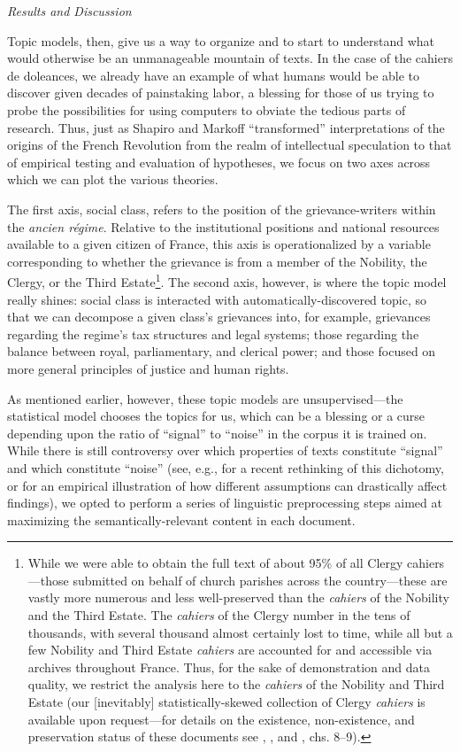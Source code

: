 \textit{Results and Discussion}

Topic models, then, give us a way to organize and to start to understand what would otherwise be an unmanageable mountain of texts. In the case of the cahiers de doleances, we already have an example of what humans would be able to discover given decades of painstaking labor, a blessing for those of us trying to probe the possibilities for using computers to obviate the tedious parts of research. Thus, just as Shapiro and Markoff ``transformed'' interpretations of the origins of the French Revolution from the realm of intellectual speculation to that of empirical testing and evaluation of hypotheses, we focus on two axes across which we can plot the various theories.

The first axis, social class, refers to the position of the grievance-writers within the \textit{ancien régime}. Relative to the institutional positions and national resources available to a given citizen of France, this axis is operationalized by a variable corresponding to whether the grievance is from a member of the Nobility, the Clergy, or the Third Estate\footnote{While we were able to obtain the full text of about 95\% of all Clergy cahiers---those submitted on behalf of church parishes across the country---these are vastly more numerous and less well-preserved than the \textit{cahiers} of the Nobility and the Third Estate. The \textit{cahiers} of the Clergy number in the tens of thousands, with several thousand almost certainly lost to time, while all but a few Nobility and Third Estate \textit{cahiers} are accounted for and accessible via archives throughout France. Thus, for the sake of demonstration and data quality, we restrict the analysis here to the \textit{cahiers} of the Nobility and Third Estate (our [inevitably] statistically-skewed collection of Clergy \textit{cahiers} is available upon request---for details on the existence, non-existence, and preservation status of these documents see \cite{hyslop_guide_1936}, \cite{duncan_baretta_selective_1987}, and \cite{shapiro_revolutionary_1998}, chs. 8--9).}. The second axis, however, is where the topic model really shines: social class is interacted with automatically-discovered topic, so that we can decompose a given class's grievances into, for example, grievances regarding the regime's tax structures and legal systems; those regarding the balance between royal, parliamentary, and clerical power; and those focused on more general principles of justice and human rights.

As mentioned earlier, however, these topic models are unsupervised—the statistical model chooses the topics for us, which can be a blessing or a curse depending upon the ratio of ``signal'' to ``noise'' in the corpus it is trained on. While there is still controversy over which properties of texts constitute ``signal'' and which constitute ``noise'' (see, e.g., \cite{schofield_pulling_2017} for a recent rethinking of this dichotomy, or \cite{denny_text_2018} for an empirical illustration of how different assumptions can drastically affect findings), we opted to perform a series of linguistic preprocessing steps aimed at maximizing the semantically-relevant content in each document.

